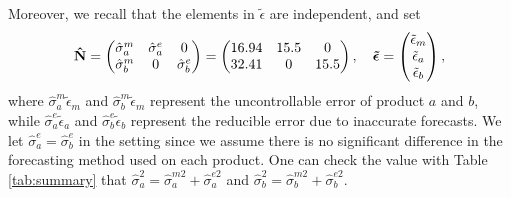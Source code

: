 \documentclass[a4paper,11pt]{article}
\begin{document}
Moreover, we recall that the elements in \mbox{\boldmath$\tilde{\epsilon}$} are independent, and set
\[
\mathbf{\hat{N}} = 
\begin{pmatrix}
\hat{\sigma}_a^m&\hat{\sigma}_a^e&0\\
\hat{\sigma}_b^m&0&\hat{\sigma}_b^e\\
\end{pmatrix} =
\begin{pmatrix}
16.94&15.5&0\\
32.41&0&15.5\\
\end{pmatrix}
,\quad \mbox{\boldmath$\tilde{\epsilon}$} = 
\begin{pmatrix}
\tilde{\epsilon}_m\\
\tilde{\epsilon}_a\\
\tilde{\epsilon}_b
\end{pmatrix},
\]
where $\hat{\sigma}_a^m \tilde{\epsilon}_m$ and $\hat{\sigma}_b^m \tilde{\epsilon}_m$ represent the uncontrollable error of product $a$ and $b$, while $\hat{\sigma}_a^e \tilde{\epsilon}_a$ and $\hat{\sigma}_b^e \tilde{\epsilon}_b$
represent the reducible error due to inaccurate forecasts. We let $\hat{\sigma}_a^e = \hat{\sigma}_b^e$ in the setting since we assume there is no significant difference in the forecasting method used on each product. One can check the value with Table \ref{tab:summary} that $\hat{\sigma}_a^2 = \hat{\sigma}_a^{m2} + \hat{\sigma}_a^{e2}$ and $\hat{\sigma}_b^2 = \hat{\sigma}_b^{m2} + \hat{\sigma}_b^{e2}$.
\end{document}
